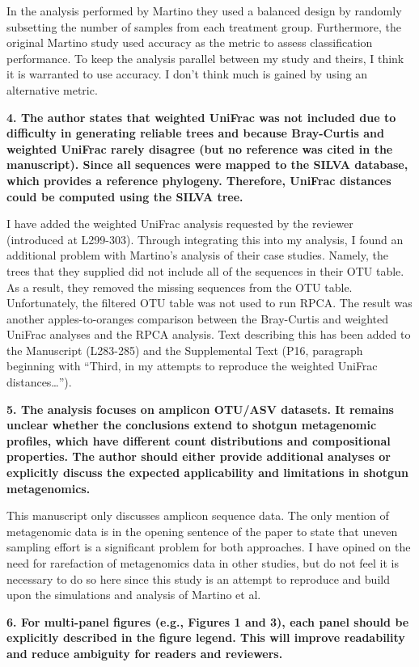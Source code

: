 \documentclass[
  11pt,
]{article}
\begin{document}
In the analysis performed by Martino they used a balanced design by
randomly subsetting the number of samples from each treatment group.
Furthermore, the original Martino study used accuracy as the metric to
assess classification performance. To keep the analysis parallel between
my study and theirs, I think it is warranted to use accuracy. I don't
think much is gained by using an alternative metric.

\textbf{4. The author states that weighted UniFrac was not included due
to difficulty in generating reliable trees and because Bray-Curtis and
weighted UniFrac rarely disagree (but no reference was cited in the
manuscript). Since all sequences were mapped to the SILVA database,
which provides a reference phylogeny. Therefore, UniFrac distances could
be computed using the SILVA tree.}

I have added the weighted UniFrac analysis requested by the reviewer
(introduced at L299-303). Through integrating this into my analysis, I
found an additional problem with Martino's analysis of their case
studies. Namely, the trees that they supplied did not include all of the
sequences in their OTU table. As a result, they removed the missing
sequences from the OTU table. Unfortunately, the filtered OTU table was
not used to run RPCA. The result was another apples-to-oranges
comparison between the Bray-Curtis and weighted UniFrac analyses and the
RPCA analysis. Text describing this has been added to the Manuscript
(L283-285) and the Supplemental Text (P16, paragraph beginning with
``Third, in my attempts to reproduce the weighted UniFrac
distances\ldots{}'').

\textbf{5. The analysis focuses on amplicon OTU/ASV datasets. It remains
unclear whether the conclusions extend to shotgun metagenomic profiles,
which have different count distributions and compositional properties.
The author should either provide additional analyses or explicitly
discuss the expected applicability and limitations in shotgun
metagenomics.}

This manuscript only discusses amplicon sequence data. The only mention
of metagenomic data is in the opening sentence of the paper to state
that uneven sampling effort is a significant problem for both
approaches. I have opined on the need for rarefaction of metagenomics
data in other studies, but do not feel it is necessary to do so here
since this study is an attempt to reproduce and build upon the
simulations and analysis of Martino et al.

\textbf{6. For multi-panel figures (e.g., Figures 1 and 3), each panel
should be explicitly described in the figure legend. This will improve
readability and reduce ambiguity for readers and reviewers.}
\end{document}
